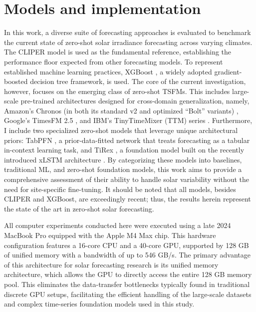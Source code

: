 \documentclass[number, 3p, 10pt, times]{elsarticle}
\begin{document}
\section{Models and implementation}
In this work, a diverse suite of forecasting approaches is evaluated to benchmark the current state of zero-shot solar irradiance forecasting across varying climates. The CLIPER model \citep{YANG2019981} is used as the fundamental reference, establishing the performance floor expected from other forecasting models. To represent established machine learning practices, XGBoost \citep{Chen2016}, a widely adopted gradient-boosted decision tree framework, is used. The core of the current investigation, however, focuses on the emerging class of zero-shot TSFMs. This includes large-scale pre-trained architectures designed for cross-domain generalization, namely, Amazon's Chronos (in both its standard v2 and optimized ``Bolt'' variants) \citep{Ansari2024}, Google's TimesFM 2.5 \citep{Das2024}, and IBM's TinyTimeMixer (TTM) series \citep{Ekambaram2024}. Furthermore, I include two specialized zero-shot models that leverage unique architectural priors: TabPFN \citep{Hollmann2025}, a prior-data-fitted network \citep{muller2024} that treats forecasting as a tabular in-context learning task, and TiRex \citep{Auer2025}, a foundation model built on the recently introduced xLSTM architecture \citep{Beck2024}. By categorizing these models into baselines, traditional ML, and zero-shot foundation models, this work aims to provide a comprehensive assessment of their ability to handle solar variability without the need for site-specific fine-tuning. It should be noted that all models, besides CLIPER and XGBoost, are exceedingly recent; thus, the results herein represent the state of the art in zero-shot solar forecasting.

All computer experiments conducted here were executed using a late 2024 MacBook Pro equipped with the Apple M4 Max chip. This hardware configuration features a 16-core CPU and a 40-core GPU, supported by 128 GB of unified memory with a bandwidth of up to 546 GB/s. The primary advantage of this architecture for solar forecasting research is its unified memory architecture, which allows the GPU to directly access the entire 128 GB memory pool. This eliminates the data-transfer bottlenecks typically found in traditional discrete GPU setups, facilitating the efficient handling of the large-scale datasets and complex time-series foundation models used in this study.
\end{document}
